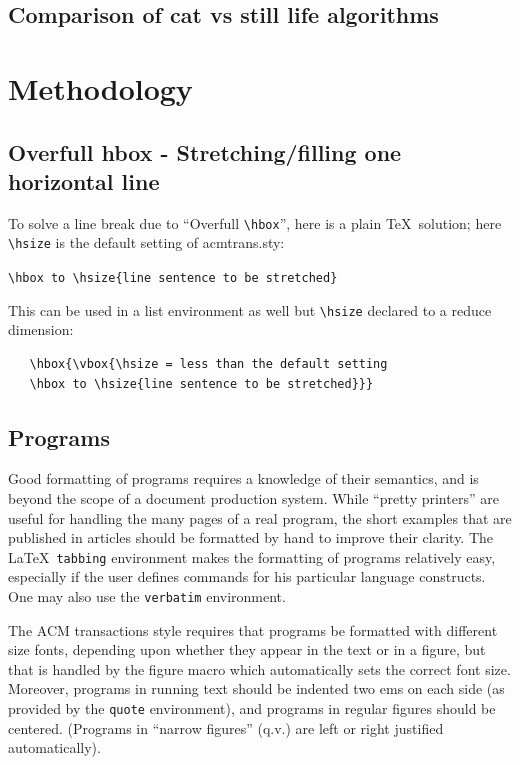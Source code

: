 \documentclass[hyperref]{acmtrans2e}
\begin{document}
\subsection{Comparison of cat vs still life algorithms}
\section{Methodology}

\subsection{Overfull hbox - Stretching/filling one horizontal line}

To solve a line break due to ``Overfull \verb|\hbox|'', here is a plain \TeX\ 
solution; here \verb|\hsize| is the default setting of acmtrans.sty:

\begin{center}
\verb|\hbox to \hsize{line sentence to be stretched}|
\end{center}

This can be used in a list environment as well but \verb|\hsize| declared to a reduce
dimension:

\begin{verbatim}
   \hbox{\vbox{\hsize = less than the default setting
   \hbox to \hsize{line sentence to be stretched}}}
\end{verbatim}

\subsection{Programs}

Good formatting of programs requires a knowledge of their semantics,
and is beyond the scope of a document production system.  While
``pretty printers'' are useful for handling the many pages of a real
program, the short examples that are published in articles should be
formatted by hand to improve their clarity.  The \LaTeX\ {\tt tabbing}
environment makes the formatting of programs relatively easy,
especially if the user defines commands for his particular language
constructs.
One may also use the {\tt verbatim} environment.

The ACM transactions style requires that programs be formatted with
different size fonts, depending upon whether they appear in the text or
in a figure, but that is handled by the figure macro which
automatically sets the correct font size.
Moreover, programs in running text should be indented two ems 
on each side (as provided by the {\tt quote} environment), and
programs in regular figures should be centered.
(Programs in ``narrow figures'' (q.v.) are left or right justified
automatically).
\end{document}
